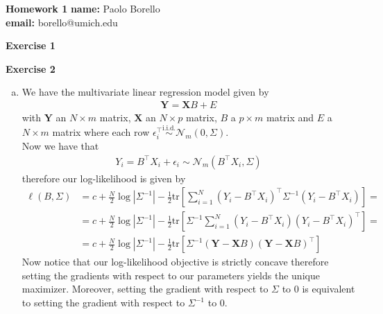 \documentclass[10pt,notitlepage]{article}
\newcommand{\MBlue}[1]{{\color{MBlue}#1}}
\newcommand{\abs}[1]{\left\vert#1\right\vert}
\newcommand{\Xv}{\mathbf{X}}
\newcommand{\Yv}{\mathbf{Y}}
\newcommand{\tr}[1]{\text{tr}\left[#1\right]}
\begin{document}
	\begin{center}
		\huge{\MBlue{\textbf{Homework 1}}}		
		\vskip20pt
		\large{
			\textbf{name:} Paolo Borello\\
            \textbf{email:} borello@umich.edu}
	\end{center}

    \vskip20pt
    \noindent
    \textbf{\large \MBlue{Exercise 1}}
    \vskip10pt
    \noindent
	\begin{exercise}[Solution]
        
    \end{exercise}

    \newpage
    \textbf{\large \MBlue{Exercise 2}}
    \vskip10pt
    \noindent
	\begin{exercise}[Solution]
        \begin{enumerate}[(a)]
            \item We have the multivariate linear regression model given by
                    \begin{align*}
                        \Yv = \Xv B + E
                    \end{align*}
                    with $\Yv$ an $N\times m$ matrix, $\Xv$ an $N\times p$ matrix, $B$ a $p\times m$ matrix and $E$ a $N\times m$ matrix where each row $\epsilon_i^\top\overset{\text{i.i.d.}}{\sim}\mathcal{N}_m\left(0,\Sigma\right)$.\\
                    Now we have that
                    \begin{align*}
                        Y_i = B^\top X_i + \epsilon_i \sim \mathcal{N}_m\left(B^\top X_i, \Sigma\right)
                    \end{align*}
                    therefore our log-likelihood is given by
                    \begin{align*}
                        \ell\left(B,\Sigma\right) &= c + \frac{N}{2}\log\abs{\Sigma^{-1}} - \frac{1}{2}\tr{\sum_{i=1}^{N}\left(Y_i-B^\top X_i\right)^\top \Sigma^{-1}\left(Y_i-B^\top X_i\right)} = \\
                        &= c + \frac{N}{2}\log\abs{\Sigma^{-1}} - \frac{1}{2}\tr{\Sigma^{-1}\sum_{i=1}^{N}\left(Y_i-B^\top X_i\right)\left(Y_i-B^\top X_i\right)^\top} = \\
                        &= c + \frac{N}{2}\log\abs{\Sigma^{-1}} - \frac{1}{2}\tr{\Sigma^{-1} \left(\Yv-\Xv B\right)\left(\Yv-\Xv B\right)^\top}
                    \end{align*}
                    Now notice that our log-likelihood objective is strictly concave therefore setting the gradients with respect to our parameters yields the unique maximizer. Moreover, setting the gradient with respect to $\Sigma$ to 0 is equivalent to setting the gradient with respect to $\Sigma^{-1}$ to 0.\\

\end{enumerate}
\end{exercise}
\end{document}
